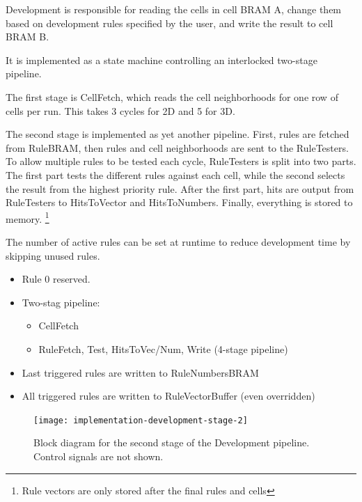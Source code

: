 Development is responsible for reading the cells in cell BRAM A, change them based on development rules specified by the user, and write the result to cell BRAM B.

It is implemented as a state machine controlling an interlocked two-stage pipeline.

The first stage is CellFetch, which reads the cell neighborhoods for one row of cells per run.
This takes 3 cycles for 2D and 5 for 3D.

The second stage is implemented as yet another pipeline.
First, rules are fetched from RuleBRAM, then rules and cell neighborhoods are sent to the RuleTesters.
To allow multiple rules to be tested each cycle, RuleTesters is split into two parts.
The first part tests the different rules against each cell, while the second selects the result from the highest priority rule.
After the first part, hits are output from RuleTesters to HitsToVector and HitsToNumbers.
Finally, everything is stored to memory.
\footnote{Rule vectors are only stored after the final rules and cells}

The number of active rules can be set at runtime to reduce development time by skipping unused rules.
\TODO
{}

\begin{itemize}
    \item Rule 0 reserved.
    \item Two-stag pipeline:
    \begin{itemize}
        \item CellFetch
        \item RuleFetch, Test, HitsToVec/Num, Write (4-stage pipeline)
    \end{itemize}
    \item Last triggered rules are written to RuleNumbersBRAM
    \item All triggered rules are written to RuleVectorBuffer (even overridden)
\end{itemize}

\begin{figure}[!ht]
    \centering
    \texttt{[image: implementation-development-stage-2]}
    \caption{
        Block diagram for the second stage of the Development pipeline.
        Control signals are not shown.
    }
    \label{fig:implementation-development-stage-2}
\end{figure}

